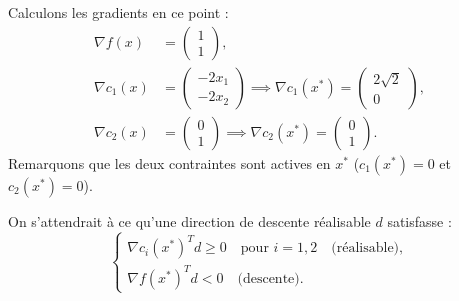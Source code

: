 Calculons les gradients en ce point :
\begin{align*}
    \nabla f(x) &= \begin{pmatrix} 1 \\ 1 \end{pmatrix}, \\
    \nabla c_1(x) &= \begin{pmatrix} -2x_1 \\ -2x_2 \end{pmatrix} \implies \nabla c_1(x^*) = \begin{pmatrix} 2\sqrt{2} \\ 0 \end{pmatrix}, \\
    \nabla c_2(x) &= \begin{pmatrix} 0 \\ 1 \end{pmatrix} \implies \nabla c_2(x^*) = \begin{pmatrix} 0 \\ 1 \end{pmatrix}.
\end{align*}
Remarquons que les deux contraintes sont actives en $x^*$ ($c_1(x^*) = 0$ et $c_2(x^*) = 0$).

On s'attendrait à ce qu'une direction de descente réalisable $d$ satisfasse :
\begin{equation}
    \begin{cases}
        \nabla c_i(x^*)^T d \ge 0 \quad \text{pour } i=1, 2 \quad \text{(réalisable)}, \\
        \nabla f(x^*)^T d < 0 \quad \text{(descente)}.
    \end{cases}
\end{equation}

